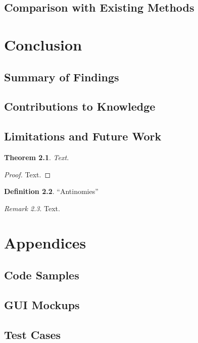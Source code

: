 \documentclass{thesis-ekf}
\newtheorem{theorem}{Theorem}[chapter]
\theoremstyle{definition}
\newtheorem{definition}[theorem]{Definition}
\theoremstyle{remark}
\newtheorem{remark}[theorem]{Remark}
\begin{document}
{\section{Comparison with Existing Methods}

\chapter{Conclusion}
\section{Summary of Findings}
\section{Contributions to Knowledge}
\section{Limitations and Future Work}







\begin{theorem}
Text.
\end{theorem}

\begin{proof}
Text.
\end{proof}

\begin{definition}
``Antinomies''
\end{definition}

\begin{remark}
Text.
\end{remark}


\chapter{Appendices}

\section{Code Samples}
\section{GUI Mockups}
\section{Test Cases}


}
\end{document}
